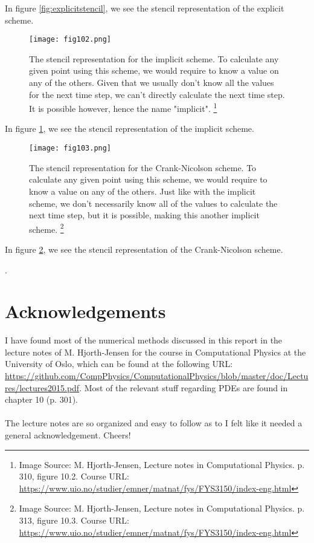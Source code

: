 \documentclass[reprint,english,notitlepage]{revtex4-1}  %
\begin{document}
\begin{appendix}
In figure \ref{fig:explicitstencil}, we see the stencil representation of the explicit scheme.

\begin{figure}[h!]
    \centering
    \texttt{[image: fig102.png]}
    \caption{The stencil representation for the implicit scheme. To calculate any given point using this scheme, we would require to know a value on any of the others. Given that we usually don't know all the values for the next time step, we can't directly calculate the next time step. It is possible however, hence the name "implicit". \footnote{Image Source: M. Hjorth-Jensen, Lecture notes in Computational Physics. p. 310, figure 10.2. Course URL: \url{https://www.uio.no/studier/emner/matnat/fys/FYS3150/index-eng.html}}}
    \label{fig:ImplicitStencil}
\end{figure}

In figure \ref{fig:ImplicitStencil}, we see the stencil representation of the implicit scheme.

\begin{figure}[h!]
    \centering
    \texttt{[image: fig103.png]}
    \caption{The stencil representation for the Crank-Nicolson scheme. To calculate any given point using this scheme, we would require to know a value on any of the others. Just like with the implicit scheme, we don't necessarily know all of the values to calculate the next time step, but it is possible, making this another implicit scheme. \footnote{Image Source: M. Hjorth-Jensen, Lecture notes in Computational Physics. p. 313, figure 10.3. Course URL: \url{https://www.uio.no/studier/emner/matnat/fys/FYS3150/index-eng.html}}}
    \label{fig:CNStencil}
\end{figure}

In figure \ref{fig:CNStencil}, we see the stencil representation of the Crank-Nicolson scheme.

\newpage
.
\newpage

\onecolumngrid

\section*{Acknowledgements}

I have found most of the numerical methods discussed in this report in the lecture notes of M. Hjorth-Jensen for the course in Computational Physics at the University of Oslo, which can be found at the following URL: \url{https://github.com/CompPhysics/ComputationalPhysics/blob/master/doc/Lectures/lectures2015.pdf}. Most of the relevant stuff regarding PDEs are found in chapter 10 (p. 301).
\\
\\
The lecture notes are so organized and easy to follow as to I felt like it needed a general acknowledgement. Cheers!


\end{appendix}
\end{document}
